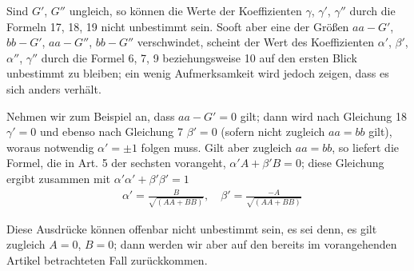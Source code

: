 
Sind $G'$, $G''$ ungleich, so können die Werte der Koeffizienten $\gamma$, $\gamma'$, $\gamma''$ durch die Formeln 17, 18, 19 nicht unbestimmt sein. Sooft aber eine der Größen
\noindent{}
$aa-G'$, $bb-G'$, $aa-G''$, $bb-G''$ verschwindet, scheint der Wert des Koeffizienten $\alpha'$, $\beta'$, $\alpha''$, $\gamma''$ durch die Formel 6, 7, 9 beziehungsweise 10 auf den ersten Blick unbestimmt zu bleiben; ein wenig Aufmerksamkeit wird jedoch zeigen, dass es sich anders verhält.

Nehmen wir zum Beispiel an, dass $aa-G'=0$ gilt; dann wird nach Gleichung 18 $\gamma'=0$ und ebenso nach Gleichung 7 $\beta'=0$ (sofern nicht zugleich $aa=bb$ gilt), woraus notwendig $\alpha'=\pm1$ folgen muss. Gilt aber zugleich $aa=bb$, so liefert die Formel, die in Art. 5 der sechsten vorangeht, $\alpha'A+\beta'B=0$; diese Gleichung ergibt zusammen mit $\alpha'\alpha'+\beta'\beta'=1$
\[
\begin{aligned}
&\alpha'=\frac{B}{\surd{(AA+BB)}},\quad
\beta'=\frac{-A}{\surd{(AA+BB)}}
\end{aligned}
\]
\par Diese Ausdrücke können offenbar nicht unbestimmt sein, es sei denn, es gilt zugleich $A=0$, $B=0$; dann werden wir aber auf den bereits im vorangehenden Artikel betrachteten Fall zurückkommen.

\clearpage
\endgroup
